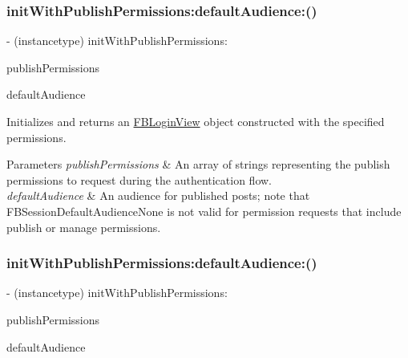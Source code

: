\subsubsection{\texorpdfstring{init\+With\+Publish\+Permissions\+:default\+Audience\+:()}{initWithPublishPermissions:defaultAudience:()}\hspace{0.1cm}{\footnotesize\ttfamily [2/5]}}
{\footnotesize\ttfamily -\/ (instancetype) init\+With\+Publish\+Permissions\+: \begin{DoxyParamCaption}\item[{(N\+S\+Array $\ast$)}]{publish\+Permissions }\item[{defaultAudience:(F\+B\+Session\+Default\+Audience)}]{default\+Audience }\end{DoxyParamCaption}}

Initializes and returns an {\ttfamily \hyperlink{interfaceFBLoginView}{F\+B\+Login\+View}} object constructed with the specified permissions.


\begin{DoxyParams}{Parameters}
{\em publish\+Permissions} & An array of strings representing the publish permissions to request during the authentication flow.\\
\hline
{\em default\+Audience} & An audience for published posts; note that F\+B\+Session\+Default\+Audience\+None is not valid for permission requests that include publish or manage permissions. \\
\hline
\end{DoxyParams}
\mbox{\label{interfaceFBLoginView_a937f55736400541dc0f21fe01d6a8b96}} 
\subsubsection{\texorpdfstring{init\+With\+Publish\+Permissions\+:default\+Audience\+:()}{initWithPublishPermissions:defaultAudience:()}\hspace{0.1cm}{\footnotesize\ttfamily [3/5]}}
{\footnotesize\ttfamily -\/ (instancetype) init\+With\+Publish\+Permissions\+: \begin{DoxyParamCaption}\item[{(N\+S\+Array $\ast$)}]{publish\+Permissions }\item[{defaultAudience:(F\+B\+Session\+Default\+Audience)}]{default\+Audience }\end{DoxyParamCaption}}

